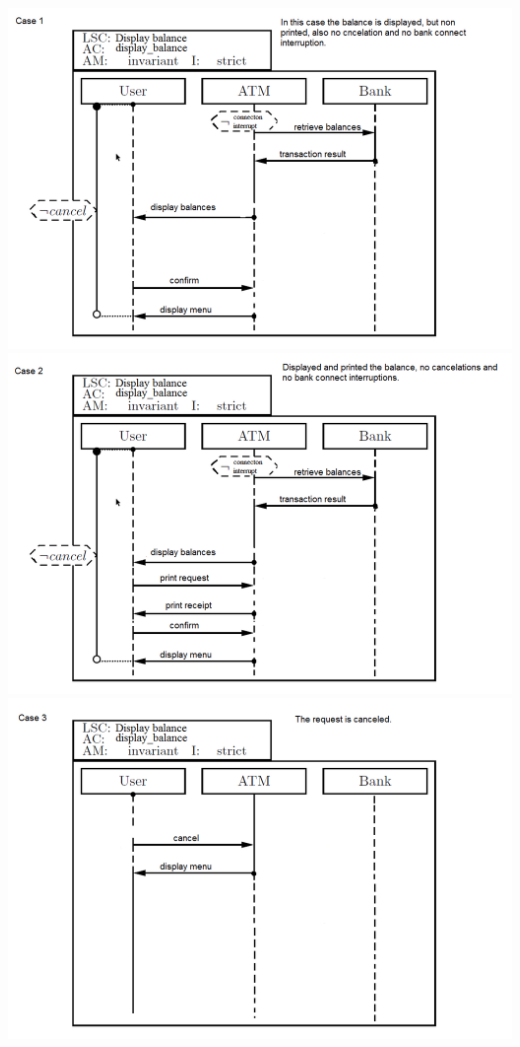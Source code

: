 \documentclass{scrartcl}
\begin{document}
\includegraphics[width=\textwidth]{Aufgabe2_LSC1.png} \\
\includegraphics[width=\textwidth]{Aufgabe2_LSC2.png} \\
\includegraphics[width=\textwidth]{Aufgabe2_LSC3.png} \\
\end{document}
